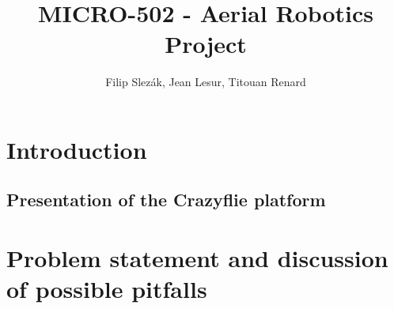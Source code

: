 \documentclass[11pt]{article}
\title{MICRO-502 - Aerial Robotics Project}
\author{Filip Slezák, Jean Lesur, Titouan Renard}
\begin{document}
\maketitle

\section{Introduction}

\subsection{Presentation of the Crazyflie platform}


\section{Problem statement and discussion of possible pitfalls}

\cite{epsilon_star}

\tableofcontents

\printbibliography %
\end{document}
